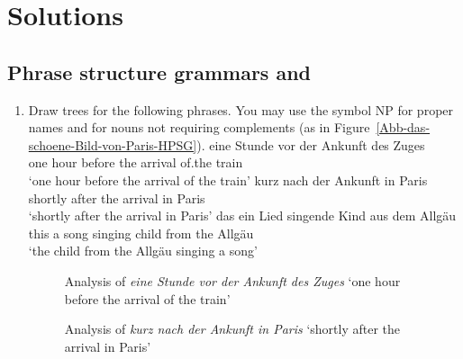 \chapter{Solutions}

\section{Phrase structure grammars and \xbart}

\begin{enumerate}
\item Draw trees for the following phrases. You may use the symbol NP for proper names and \nbar for
  nouns not requiring complements (as in Figure~\ref{Abb-das-schoene-Bild-von-Paris-HPSG}).
\eal
\ex 
\gll eine Stunde vor der Ankunft des Zuges\\
     one  hour   before the arrival of.the train\\
\glt `one  hour   before the arrival of the train'
\ex 
\gll kurz    nach  der Ankunft in Paris\\
     shortly after the arrival in Paris\\
\glt `shortly after the arrival in Paris'
\ex
\gll das ein Lied singende Kind aus dem Allgäu\\
     this a song  singing child from the Allgäu\\
\glt `the child from the Allgäu singing a song'
\zl
\largerpage

\begin{figure}
\caption{Analysis of \emph{eine Stunde vor der Ankunft des Zuges} `one hour before the arrival of
  the train'}
\end{figure}

\begin{figure}
\caption{Analysis of \emph{kurz nach der Ankunft in Paris} `shortly after the arrival in Paris'}
\end{figure}


\end{enumerate}
